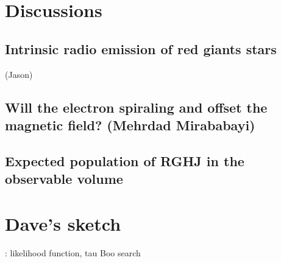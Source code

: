 \documentclass{emulateapj}
\begin{document}
\newpage

\section{Discussions}
\label{s:discussion}

\subsection{Intrinsic radio emission of red giants stars}
\label{ss:RGradio}

(Jason)


\subsection{Will the electron spiraling and offset the magnetic field? (Mehrdad Mirababayi)}
\label{ss:offset}


\citet{gorman2013}

\subsection{Expected population of RGHJ in the observable volume}
\label{ss:number}

\newpage


\section{Dave's sketch}

\citep{spiegel2008}

\citep{lecavelier_et_al2013}

\citep{janhunen_et_al2003}

\citep{zarka1992, zarka1998}

\citep{farrell_et_al2004}

\citep{lazio+farrell2007}: likelihood function, tau Boo search

\citep{lecavelier_et_al2009}

\citep{spiegel2012}

\citep{nordhaus+spiegel2013}
\end{document}
